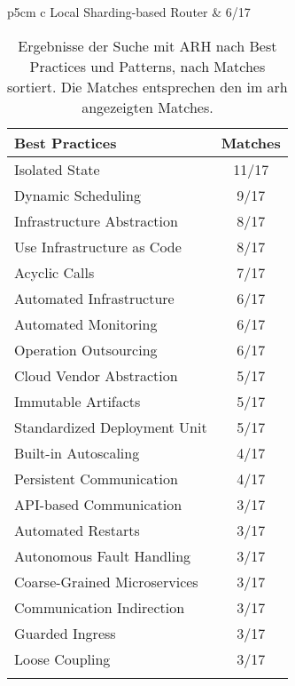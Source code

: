 \begin{table}[!htb]
\begin{minipage}{.5\linewidth}
\begin{tabular}{p{5cm} c}
			Local Sharding-based Router                 & 6/17 \\ \bottomrule
		\end{tabular}
	\end{minipage}%
	\begin{minipage}{.5\linewidth}
		\centering
		\begin{tabular}{p{5cm} c}
			\toprule
			\textbf{Best Practices} & \textbf{Matches} \\ \midrule
			Isolated State                        & 11/17 \\ \hline
			Dynamic Scheduling                    & 9/17 \\ \hline
			Infrastructure Abstraction            & 8/17 \\ \hline
			Use Infrastructure as Code            & 8/17 \\ \hline
			Acyclic Calls                         & 7/17 \\ \hline
			Automated Infrastructure              & 6/17 \\ \hline
			Automated Monitoring                  & 6/17 \\ \hline
			Operation Outsourcing                 & 6/17 \\ \hline
			Cloud Vendor Abstraction              & 5/17 \\ \hline
			Immutable Artifacts                   & 5/17 \\ \hline
			Standardized Deployment Unit          & 5/17 \\ \hline
			Built-in Autoscaling                  & 4/17 \\ \hline
			Persistent Communication              & 4/17 \\ \hline
			API-based Communication               & 3/17 \\ \hline
			Automated Restarts                    & 3/17 \\ \hline
			Autonomous Fault Handling             & 3/17 \\ \hline
			Coarse-Grained Microservices          & 3/17 \\ \hline
			Communication Indirection             & 3/17 \\ \hline
			Guarded Ingress                       & 3/17 \\ \hline
			Loose Coupling                        & 3/17 \\ \bottomrule
			\\
		\end{tabular}
	\end{minipage}
	
	\caption[Ergebnisse der Suche mit ARH nach Best Practices und Patterns]{
		Ergebnisse der Suche mit ARH nach Best Practices und Patterns, nach Matches sortiert.
		Die Matches entsprechen den im \gls{arh} angezeigten Matches.
	}
	\label{tab:interviews-patterns}
\end{table}

